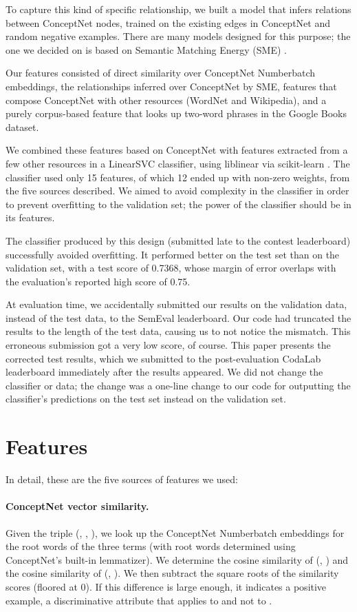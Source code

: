 \documentclass[11pt,a4paper]{article}
\begin{document}
To capture this kind of specific relationship, we built a model that infers
relations between ConceptNet nodes, trained on the existing edges in ConceptNet
and random negative examples. There are many models designed for this purpose;
the one we decided on is based on Semantic Matching Energy (SME)
\cite{bordes2014semantic}.

Our features consisted of direct similarity over ConceptNet Numberbatch embeddings, the
relationships inferred over ConceptNet by SME, features that compose ConceptNet
with other resources (WordNet and Wikipedia), and a purely corpus-based feature
that looks up two-word phrases in the Google Books dataset.

We combined these features based on ConceptNet with features extracted from a
few other resources in a LinearSVC classifier, using liblinear
\cite{fan2008liblinear} via scikit-learn \cite{pedregosa2011scikit}. The
classifier used only 15 features, of which 12 ended up with non-zero weights,
from the five sources described. We aimed to avoid complexity in the classifier
in order to prevent overfitting to the validation set; the power of the
classifier should be in its features.

The classifier produced by this design (submitted late to the contest
leaderboard) successfully avoided overfitting. It performed better on the test
set than on the validation set, with a test  score of 0.7368, whose margin of
error overlaps with the evaluation's reported high score of 0.75.

At evaluation time, we accidentally submitted our results on the validation
data, instead of the test data, to the SemEval leaderboard. Our code had
truncated the results to the length of the test data, causing us to not notice
the mismatch. This erroneous submission got a very low score, of course. This
paper presents the corrected test results, which we submitted to the
post-evaluation CodaLab leaderboard immediately after the results appeared.  We
did not change the classifier or data; the change was a one-line change to our
code for outputting the classifier's predictions on the test set instead on the
validation set.


\section{Features}

In detail, these are the five sources of features we used:

\paragraph{ConceptNet vector similarity.} Given the triple (\termOne, \termTwo,
\att), we look up the ConceptNet Numberbatch embeddings for the root words of the
three terms (with root words determined using ConceptNet's built-in
lemmatizer). We determine the cosine similarity of (\termOne, \att) and the
cosine similarity of (\termTwo, \att). We then subtract the square roots of the
similarity scores (floored at 0). If this difference is large enough, it
indicates a positive example, a discriminative attribute that applies to
\termOne{} and not to \termTwo.
\end{document}

